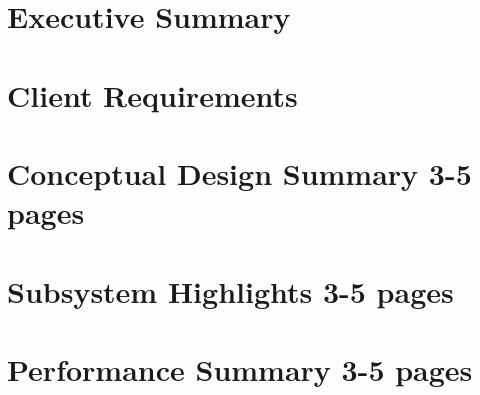 \documentclass[11pt]{article}
\begin{document}


\section{Executive Summary}



\section{Client Requirements}




\section{Conceptual Design Summary 3-5 pages}



\section{Subsystem Highlights 3-5 pages}



\section{Performance Summary 3-5 pages}


\end{document}
